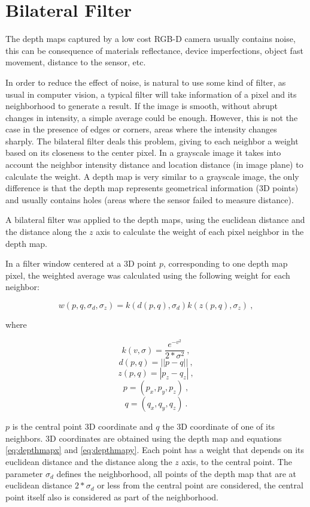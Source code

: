 \section{Bilateral Filter}


The depth maps captured by a low cost RGB-D camera usually contains noise, this can be 
consequence of materials reflectance, device imperfections, object fast movement, distance to the 
sensor, etc. 

In order to reduce the effect of noise, is natural to use some kind of filter, as usual in computer 
vision, a typical filter will take information of a pixel and its neighborhood to generate a result. 
If the image is smooth, without abrupt changes in intensity, a simple average could be enough. However, this 
is not the case in the presence of edges or corners, areas where the intensity changes sharply. 
The bilateral filter deals this problem, giving to each neighbor a weight based on its closeness  
to the center pixel. In a grayscale image it takes into account 
the neighbor intensity distance and location distance (in image plane) to calculate the weight.  A depth map is very similar to a grayscale 
image, the only difference is that the depth map represents geometrical information (3D points) and usually contains holes 
(areas where the sensor failed to measure distance). 

A bilateral filter was applied to the depth maps, using the euclidean distance and the distance along the $z$ axis to calculate 
the weight of each pixel neighbor in the depth map. 

In a filter window centered at a 3D point $p$, corresponding to one depth map pixel, 
the weighted average was calculated using the following weight for each neighbor:


$$ w(p,q,\sigma_d,\sigma_z) = k(d(p,q),\sigma_d) k(z(p,q),\sigma_z)\ , $$

\noindent where 

$$ k(v,\sigma) = \frac{e^{-v^2}}{2*\sigma^2}\ , $$
$$ d(p,q) = ||p - q||\ , $$
$$ z(p,q) = |p_z - q_z|\ , $$
$$ p = (p_x,p_y,p_z)\ , $$ 
$$ q = (q_x,q_y,q_z)\ . $$

\noindent $p$ is the central point 3D coordinate and $q$ the 3D coordinate of one of its neighbors. 3D coordinates are obtained using
 the depth map and equations \ref{eq:depthmapx} and \ref{eq:depthmapy}.  Each point has a weight that depends on its euclidean distance and
 the distance along the $z$ axis, to the central point. The parameter $\sigma_d$ defines 
the neighborhood, all points of the depth map that are at euclidean distance $2*\sigma_d$ or less from the central point are considered, the 
central point itself also is considered as part of the neighborhood.


